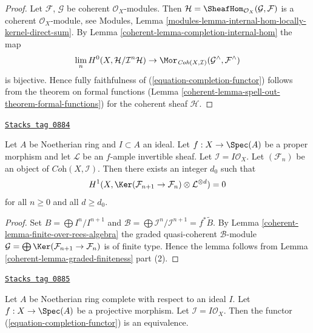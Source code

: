 \begin{proof}

Let $\mathcal{F}$, $\mathcal{G}$ be coherent $\mathcal{O}_X$-modules.
Then $\mathcal{H} = \SheafHom_{\mathcal{O}_X}(\mathcal{G}, \mathcal{F})$
is a coherent $\mathcal{O}_X$-module, see
Modules, Lemma \ref{modules-lemma-internal-hom-locally-kernel-direct-sum}.
By Lemma \ref{coherent-lemma-completion-internal-hom} the map
$$
\lim_n H^0(X, \mathcal{H}/\mathcal{I}^n\mathcal{H})
\to
\Mor_{\textit{Coh}(X, \mathcal{I})}
(\mathcal{G}^\wedge, \mathcal{F}^\wedge)
$$
is bijective. Hence fully faithfulness of
(\ref{equation-completion-functor}) follows from the theorem on formal
functions (Lemma \ref{coherent-lemma-spell-out-theorem-formal-functions})
for the coherent sheaf $\mathcal{H}$.
\end{proof}

\begin{lemma}
\label{coherent-lemma-vanishing-projective}
\href{https://stacks.math.columbia.edu/tag/0884}{\texttt{Stacks tag 0884}}

Let $A$ be Noetherian ring and $I \subset A$ an ideal.
Let $f : X \to \Spec(A)$ be a proper morphism and let
$\mathcal{L}$ be an $f$-ample invertible sheaf. Let
$\mathcal{I} = I\mathcal{O}_X$. Let $(\mathcal{F}_n)$ be an
object of $\textit{Coh}(X, \mathcal{I})$. Then there exists an
integer $d_0$ such that
$$
H^1(X, \Ker(\mathcal{F}_{n + 1} \to \mathcal{F}_n)
\otimes \mathcal{L}^{\otimes d} )
= 0
$$
for all $n \geq 0$ and all $d \geq d_0$.
\end{lemma}

\begin{proof}

Set $B = \bigoplus I^n/I^{n + 1}$ and
$\mathcal{B} = \bigoplus \mathcal{I}^n/\mathcal{I}^{n + 1} = f^*\widetilde{B}$.
By Lemma \ref{coherent-lemma-finite-over-rees-algebra} the graded quasi-coherent
$\mathcal{B}$-module
$\mathcal{G} = \bigoplus \Ker(\mathcal{F}_{n + 1} \to \mathcal{F}_n)$
is of finite type. Hence the lemma follows from
Lemma \ref{coherent-lemma-graded-finiteness} part (2).
\end{proof}

\begin{lemma}
\label{coherent-lemma-existence-projective}
\href{https://stacks.math.columbia.edu/tag/0885}{\texttt{Stacks tag 0885}}

Let $A$ be Noetherian ring complete with respect to an ideal $I$.
Let $f : X \to \Spec(A)$ be a projective morphism. Let
$\mathcal{I} = I\mathcal{O}_X$.
Then the functor (\ref{equation-completion-functor}) is an equivalence.
\end{lemma}

